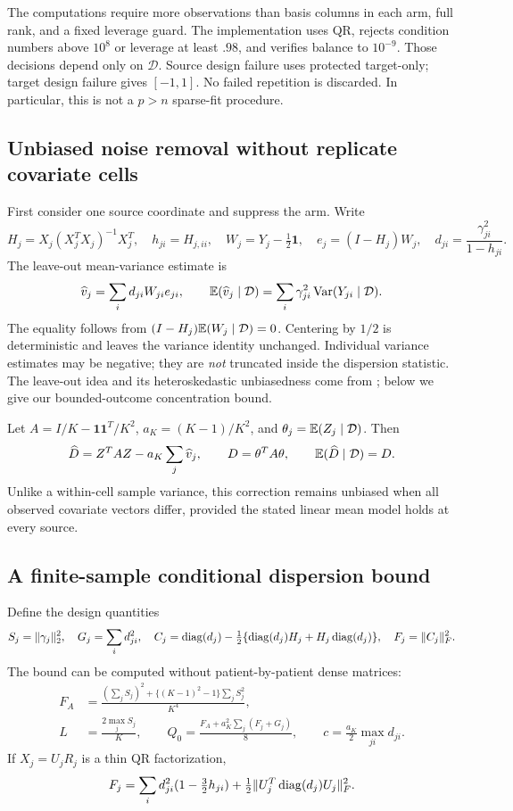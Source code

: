 The computations require more observations than basis columns in each arm,
full rank, and a fixed leverage guard. The implementation uses QR, rejects
condition numbers above $10^8$ or leverage at least $.98$, and verifies balance
to $10^{-9}$. Those decisions depend only on $\mathcal D$. Source design failure
uses protected target-only; target design failure gives $[-1,1]$. No failed
repetition is discarded. In particular, this is not a $p>n$ sparse-fit procedure.

\subsection{Unbiased noise removal without replicate covariate cells}

First consider one source coordinate and suppress the arm. Write
\[
 H_j=X_j(X_j^TX_j)^{-1}X_j^T,\quad h_{ji}=H_{j,ii},\quad
 W_j=Y_j-\tfrac12\boldsymbol1,\quad e_j=(I-H_j)W_j,
 \quad d_{ji}=\frac{\gamma_{ji}^2}{1-h_{ji}}.
\]
The leave-out mean-variance estimate is
\[
 \widehat v_j=\sum_i d_{ji}W_{ji}e_{ji},\qquad
 \mathbb E(\widehat v_j\mid\mathcal D)
     =\sum_i\gamma_{ji}^2\operatorname{Var}(Y_{ji}\mid\mathcal D).
\]
The equality follows from $(I-H_j)\mathbb E(W_j\mid\mathcal D)=0$. Centering by
$1/2$ is deterministic and leaves the variance identity unchanged. Individual
variance estimates may be negative; they are \emph{not} truncated inside the
dispersion statistic. The leave-out idea and its heteroskedastic unbiasedness
come from \citet{kss2020}; below we give our bounded-outcome concentration bound.

Let $A=I/K-\boldsymbol1\boldsymbol1^T/K^2$, $a_K=(K-1)/K^2$, and
$\theta_j=\mathbb E(Z_j\mid\mathcal D)$. Then
\[
 \widehat D=Z^TAZ-a_K\sum_j\widehat v_j,\qquad
 D=\theta^TA\theta,\qquad \mathbb E(\widehat D\mid\mathcal D)=D.
\]
Unlike a within-cell sample variance, this correction remains unbiased when
all observed covariate vectors differ, provided the stated linear mean model
holds at every source.

\subsection{A finite-sample conditional dispersion bound}

Define the design quantities
\[
 S_j=\|\gamma_j\|_2^2,\quad G_j=\sum_i d_{ji}^2,\quad
 C_j=\operatorname{diag}(d_j)-\tfrac12\{\operatorname{diag}(d_j)H_j+H_j\operatorname{diag}(d_j)\},\quad F_j=\|C_j\|_F^2.
\]
The bound can be computed without patient-by-patient dense matrices:
\begin{align*}
 F_A&=\frac{(\sum_j S_j)^2+\{(K-1)^2-1\}\sum_jS_j^2}{K^4},\\
 L&=\frac{2\max_j S_j}{K},\qquad
 Q_0=\frac{F_A+a_K^2\sum_j(F_j+G_j)}8,\qquad
 c=\frac{a_K}2\max_{ji}d_{ji}.
\end{align*}
If $X_j=U_jR_j$ is a thin QR factorization,
\[
 F_j=\sum_i d_{ji}^2(1-\tfrac32h_{ji})
       +\tfrac12\|U_j^T\operatorname{diag}(d_j)U_j\|_F^2.
\]

